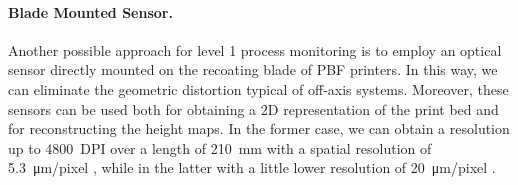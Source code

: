 \paragraph{Blade Mounted Sensor.} Another possible approach for level 1 process monitoring is to employ an optical sensor directly mounted on the recoating blade of PBF printers. In this way, we can eliminate the geometric distortion typical of off-axis systems. Moreover, these sensors can be used both for obtaining a 2D representation of the print bed and for reconstructing the height maps. In the former case, we can obtain a resolution up to \SI{4800}{DPI} over a length of \SI{210}{\milli\metre} with a spatial resolution of \SI{5.3}{\micro\metre / pixel} \cite{tan_phuc_high-resolution_2019}, while in the latter with a little lower resolution of \SI{20}{\micro\metre / pixel} \cite{barrett_micron-level_2018}.

